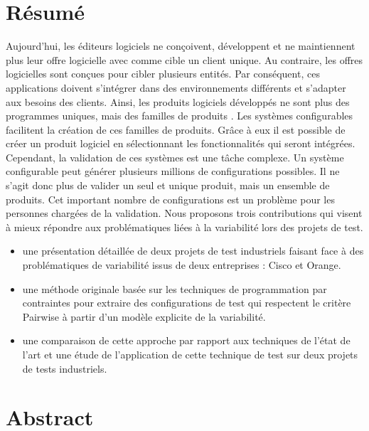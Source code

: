 \markboth{}{}
\pagestyle{empty}
\vspace{-2cm}
\section*{Résumé}
Aujourd'hui, les éditeurs logiciels ne conçoivent, développent et ne maintiennent plus leur offre logicielle avec comme cible un client unique. Au contraire, les offres logicielles sont conçues pour cibler plusieurs entités. Par conséquent, ces applications doivent s'intégrer dans des environnements différents et s'adapter aux besoins des clients. Ainsi, les produits logiciels développés ne sont plus des programmes uniques, mais des familles de produits \cite{parnas1976design}.
Les systèmes configurables facilitent la création de ces familles de produits. Grâce à eux il est possible de créer un produit logiciel en sélectionnant les fonctionnalités qui seront intégrées. Cependant, la validation de ces systèmes  est une tâche complexe. Un système configurable   peut  générer plusieurs millions de configurations possibles. Il ne s'agit donc plus de valider un seul et unique produit, mais un ensemble de produits. Cet important nombre de configurations est un problème pour les personnes  chargées de la validation.
Nous proposons trois contributions qui visent à mieux répondre aux problématiques liées à la variabilité lors des projets de test. 
\begin{itemize}
\item  une présentation détaillée de deux projets de test industriels faisant face à des problématiques de variabilité issus de deux entreprises : Cisco et Orange.

\item une méthode originale basée sur les techniques de programmation par contraintes pour extraire des configurations de test qui respectent le critère Pairwise à partir d'un modèle explicite de la variabilité. 

\item une comparaison de cette approche par rapport aux techniques de l'état de l'art et une étude de l'application de cette technique de test sur deux projets de tests industriels.
\end{itemize}


\section*{Abstract}

